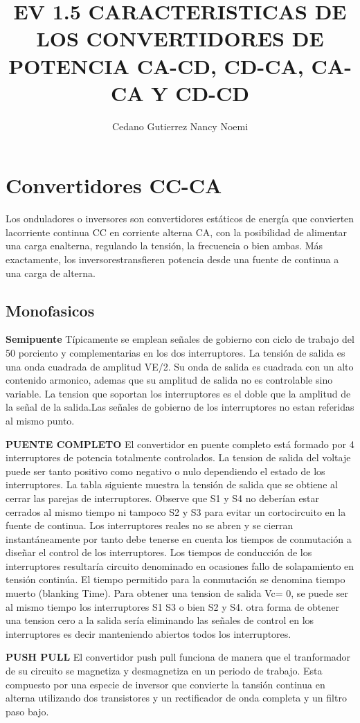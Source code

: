 \documentclass[10pt,letterpaper]{article}
\title{EV 1.5 CARACTERISTICAS DE LOS CONVERTIDORES DE POTENCIA CA-CD, CD-CA, CA-CA Y CD-CD}
\author{Cedano Gutierrez Nancy Noemi}
\begin{document}
\section{Convertidores CC-CA}
Los onduladores o inversores son convertidores estáticos de energía que convierten lacorriente continua CC en corriente alterna CA, con la posibilidad de alimentar una carga enalterna, regulando la tensión, la frecuencia o bien ambas. Más exactamente, los inversorestransfieren potencia desde una fuente de continua a una carga de alterna.

\subsection{Monofasicos}
\textbf{Semipuente}
Típicamente se emplean señales de gobierno con ciclo de trabajo del 50 porciento y complementarias en los dos interruptores.
La tensión de salida es una onda cuadrada de amplitud VE/2. Su onda de salida es cuadrada con un alto contenido armonico, ademas que su amplitud de salida no es controlable sino variable. La tension que soportan los interruptores es el doble que la amplitud de la señal de la salida.Las señales de gobierno de los interruptores no estan referidas al mismo punto.

\textbf{PUENTE COMPLETO}
El convertidor en puente completo está formado por 4 interruptores de potencia totalmente controlados. La tension de salida del voltaje puede ser tanto positivo como negativo o nulo dependiendo el estado de los interruptores. La tabla siguiente muestra la tensión de salida que se obtiene al cerrar las parejas de interruptores. Observe que S1 y S4 no deberían estar cerrados al mismo tiempo ni tampoco S2 y S3 para evitar un cortocircuito en la fuente de continua. Los interruptores reales no se abren y se cierran instantáneamente por tanto debe tenerse en cuenta los tiempos de conmutación a diseñar el control de los interruptores. Los tiempos de conducción de los interruptores resultaría circuito denominado en ocasiones fallo de solapamiento en tensión continúa. El tiempo permitido para la conmutación se denomina tiempo muerto (blanking Time). Para obtener una tension de salida Vc= 0, se puede ser al mismo tiempo los interruptores S1 S3 o bien S2 y S4. otra forma de obtener una tension cero a la salida sería eliminando las señales de control en los interruptores es decir manteniendo abiertos todos los interruptores.

\textbf{PUSH PULL}
El convertidor push pull funciona de manera que el tranformador de su circuito se magnetiza y desmagnetiza en un periodo de trabajo. Esta compuesto por una especie de inversor que convierte la tansión continua en alterna utilizando dos transistores y un rectificador de onda completa y un filtro paso bajo.
\end{document}
